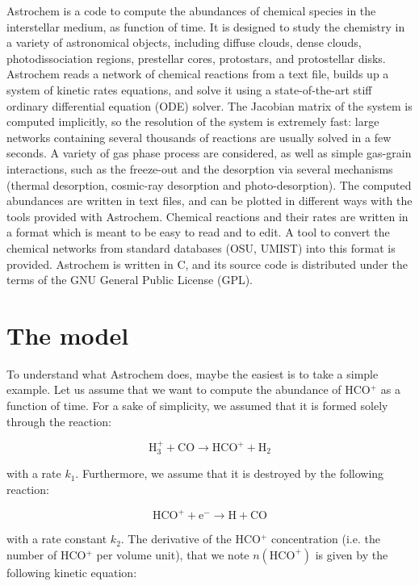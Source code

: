 \documentclass[a4paper,12pt]{article}
\newcommand{\conc}[1]{n(\mathrm{#1})}
\begin{document}
{Astrochem is a code to compute the abundances of chemical species in
the interstellar medium, as function of time. It is designed to study
the chemistry in a variety of astronomical objects, including diffuse
clouds, dense clouds, photodissociation regions, prestellar cores,
protostars, and protostellar disks. Astrochem reads a network of
chemical reactions from a text file, builds up a system of kinetic
rates equations, and solve it using a state-of-the-art stiff ordinary
differential equation (ODE) solver. The Jacobian matrix of the system
is computed implicitly, so the resolution of the system is extremely
fast: large networks containing several thousands of reactions are
usually solved in a few seconds. A variety of gas phase process are
considered, as well as simple gas-grain interactions, such as the
freeze-out and the desorption via several mechanisms (thermal
desorption, cosmic-ray desorption and photo-desorption). The computed
abundances are written in text files, and can be plotted in different
ways with the tools provided with Astrochem. Chemical reactions and
their rates are written in a format which is meant to be easy to read
and to edit. A tool to convert the chemical networks from standard
databases (OSU, UMIST) into this format is provided. Astrochem is
written in C, and its source code is distributed under the terms of
the GNU General Public License (GPL).

\section{The model}
\label{sec:model}

To understand what Astrochem does, maybe the easiest is to take a
simple example. Let us assume that we want to compute the
abundance of HCO$^{+}$ as a function of time. For a sake of
simplicity, we assumed that it is formed solely through the reaction:

\begin{equation}
  \mathrm{H_{3}^{+} + CO \rightarrow HCO^{+} + H_{2}}
\end{equation}

\noindent
with a rate $k_{1}$. Furthermore, we assume that it is destroyed by
the following reaction:

\begin{equation}
  \mathrm{HCO^{+} + e^{-} \rightarrow H + CO}
\end{equation}

\noindent
with a rate constant $k_{2}$. The derivative of the HCO$^{+}$
concentration (i.e. the number of HCO$^{+}$ per volume unit), that we
note $\conc{HCO^{+}}$ is given by the following kinetic equation:

}
\end{document}
